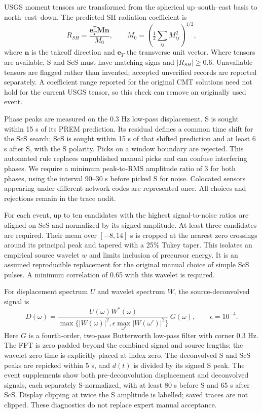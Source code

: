 USGS moment tensors are transformed from the spherical up--south--east basis to
north--east--down. The predicted SH radiation coefficient is
\begin{equation} R_{SH}=\frac{\boldsymbol{e}_T^{\mathsf T}\boldsymbol{M}\boldsymbol{n}}{M_0},
\qquad M_0=\left(\tfrac12\sum_{ij}M_{ij}^2\right)^{1/2}, \end{equation}
where $\boldsymbol{n}$ is the takeoff direction and $\boldsymbol{e}_T$ the transverse
unit vector. Where tensors are available, S and ScS must have matching signs and
$|R_{SH}|\geq0.6$. Unavailable tensors are flagged rather than invented; accepted
unverified records are reported separately. A coefficient range reported for the
original CMT solutions need not hold for the current USGS tensor, so this check
can remove an originally used event.

Phase peaks are measured on the 0.3 Hz low-pass displacement. S is sought within
15 s of its PREM prediction. Its residual defines a common time shift for the
ScS search; ScS is sought within 15 s of that shifted prediction and at least
6 s after S, with the S polarity. Picks on a window boundary are rejected.
This automated rule replaces unpublished manual picks and can confuse interfering
phases. We require a minimum peak-to-RMS amplitude ratio of 3 for both phases,
using the interval 90--30 s before picked S for noise. Colocated sensors appearing
under different network codes are represented once. All choices and rejections
remain in the trace audit.

For each event, up to ten candidates with the highest signal-to-noise ratios are
aligned on ScS and normalized by its signed amplitude. At least three candidates
are required. Their mean over $[-8,14]$ s is cropped at the nearest zero crossings
around its principal peak and tapered with a 25\% Tukey taper. This isolates an
empirical source wavelet $w$ and limits inclusion of precursor energy. It is an
assumed reproducible replacement for the original manual choice of simple ScS
pulses. A minimum correlation of 0.65 with this wavelet is required.

For displacement spectrum $U$ and wavelet spectrum $W$, the source-deconvolved
signal is
\begin{equation}
 D(\omega)=\frac{U(\omega)W^*(\omega)}{
 \max\{|W(\omega)|^2,\epsilon\max_{\omega'}|W(\omega')|^2\}}\,G(\omega),
 \qquad \epsilon=10^{-4}.
\end{equation}
Here $G$ is a fourth-order, two-pass Butterworth low-pass filter with corner
0.3 Hz. The FFT is zero padded beyond the combined signal and source lengths;
the wavelet zero time is explicitly placed at index zero. The deconvolved S and
ScS peaks are repicked within 5 s, and $d(t)$ is divided by its signed S peak.
The event supplements show both pre-deconvolution displacement and deconvolved
signals, each separately S-normalized, with at least 80 s before S and 65 s
after ScS. Display clipping at twice the S amplitude is labelled; saved traces
are not clipped. These diagnostics do not replace expert manual acceptance.


